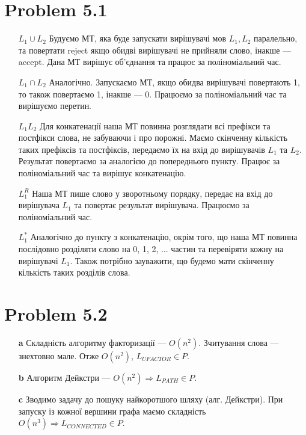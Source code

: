 \documentclass[12pt,letterpaper]{article}
\begin{document}
\section{Problem 5.1}

\begin{itemize}
    \item[$L_1 \cup L_2$] Будуємо МТ, яка буде запускати вирішувачі мов $L_1, L_2$ паралельно, та повертати reject якщо обидві вирішувачі не прийняли слово, інакше --- accept. Дана МТ вирішує об'єднання та працює за поліноміальний час.
    \item[$L_1 \cap L_2$] Аналогічно. Запускаємо МТ, якщо обидва вирішувачі повертають 1, то також повертаємо 1, інакше --- 0. Працюємо за поліноміальний час та вирішуємо перетин.
    \item[$L_1 L_2$] Для конкатенації наша МТ повинна розглядати всі префікси та постфікси слова, не забуваючи і про порожні. Маємо скінченну кількість таких префіксів та постфіксів, передаємо їх на вхід до вирішувачів $L_1$ та $L_2$. Результат повертаємо за аналогією до попереднього пункту. Працює за поліноміальний час та вирішує конкатенацію.
    \item[$L_1^R$] Наша МТ пише слово у зворотньому порядку, передає на вхід до вирішувача $L_1$ та повертає результат вирішувача. Працюємо за поліноміальний час.
    \item[$L_1^*$] Аналогічно до пункту з конкатенацію, окрім того, що наша МТ повинна послідовно розділяти слово на 0, 1, 2, ... частин та перевіряти кожну на вирішувачі $L_1$. Також потрібно зауважити, що будемо мати скінченну кількість таких розділів слова.
\end{itemize}

\section{Problem 5.2}
\begin{itemize}
    \item[\textbf{a}] Складність алгоритму факторизації --- $O(n^2)$. Зчитування слова --- знехтовно мале. Отже $O(n^2)$, $L_{UFACTOR} \in P$.
    \item[\textbf{b}] Алгоритм Дейкстри --- $O(n^2) \Rightarrow L_{PATH} \in P$.
    \item[\textbf{c}] Зводимо задачу до пошуку найкоротшого шляху (алг. Дейкстри). При запуску із кожної вершини графа маємо складність $O(n^3) \Rightarrow L_{CONNECTED} \in P$.
\end{itemize}
\end{document}
